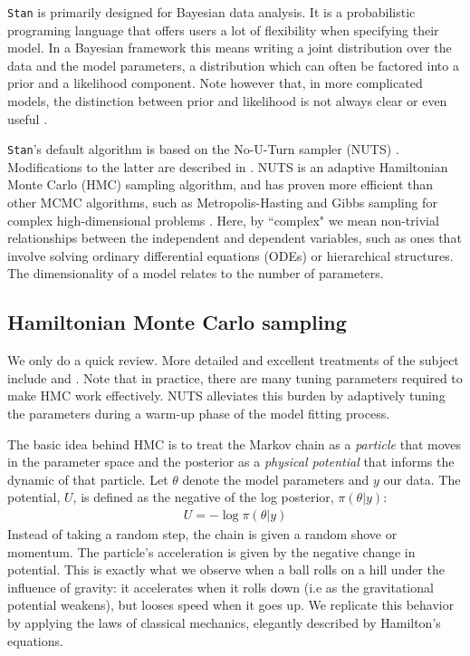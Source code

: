 \documentclass[11pt]{article}
\begin{document}
  \texttt{Stan} is primarily designed for Bayesian data analysis.
  It is a probabilistic programing language that offers users a lot of flexibility
  when specifying their model. In a Bayesian framework this means writing
  a joint distribution over the data and the model parameters,
  a distribution which can often be factored into a prior and a likelihood component.
  Note however that, in more complicated models, the distinction between prior and likelihood
  is not always clear or even useful \cite{Gelman:2017}.

  \texttt{Stan}'s default algorithm is based on the No-U-Turn sampler
  (NUTS) \cite{Hoffman:2014}. Modifications to the latter are described in \cite{Betancourt:2017}.
  NUTS is an adaptive Hamiltonian Monte Carlo (HMC) sampling algorithm,
  and has proven more efficient than other MCMC algorithms,
  such as Metropolis-Hasting and Gibbs sampling for complex high-dimensional problems
  \cite{Hoffman:2014}.
  Here, by ``complex" we mean non-trivial relationships between the independent and dependent
  variables, such as ones that involve solving ordinary differential equations (ODEs) or hierarchical structures. 
  The dimensionality of a model relates to the number of parameters.
  
  
  \subsection{Hamiltonian Monte Carlo sampling}
  
  We only do a quick review. More detailed and excellent treatments of the subject 
  include \cite{Betancourt:2017} and  \cite{Radford:2010}.
  Note that in practice, there are many tuning parameters required to make HMC work effectively.
  NUTS alleviates this burden by adaptively tuning the parameters during a warm-up phase of the
  model fitting process.
    
  The basic idea behind HMC is to treat the Markov chain as a \textit{particle} that moves in the
  parameter space and the posterior as a \textit{physical potential} that informs the dynamic of
  that particle. Let $\theta$ denote the model parameters and $y$ our data.
  The potential, $U$, is defined as the negative of the log posterior, $\pi(\theta | y)$:
  \begin{eqnarray}
    U = - \log \pi(\theta | y)
  \label{eq:potential}
  \end{eqnarray}
  Instead of taking a random step, the chain is given a random shove or momentum. The
  particle's acceleration is given by the negative change in potential. This is exactly what 
  we observe when a ball rolls on a hill under the influence of gravity: it accelerates when
  it rolls down (i.e as the gravitational potential weakens), but looses speed when it goes
  up. We replicate this behavior by applying the laws of classical mechanics, elegantly 
  described by Hamilton's equations.
  
\end{document}
